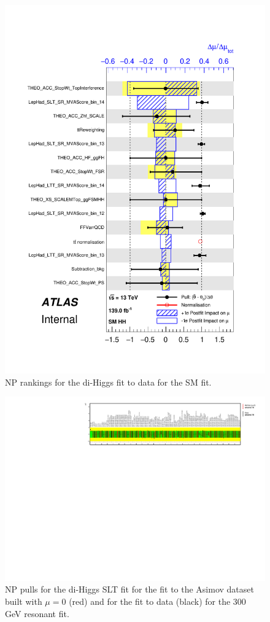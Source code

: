    \begin{figure}
   \centering
   \includegraphics[width=.8\textwidth]{figures/results/HH/LepHad/pulls_SigXsecOverSM_125.pdf}
   \caption{NP rankings for the di-Higgs \lephad fit to data for the SM fit.}
   \label{fig:LepHadPostfitNPRankingsSM-Aux}
   \end{figure}

\begin{figure}
\centering
\includegraphics[angle=270]{figures/results/HH/LepHad/NP_allExceptGammas_2HDM300_SLT.pdf}
\caption{NP pulls for the di-Higgs \lephad SLT fit for the fit to the Asimov dataset built with $\mu=0$ (red) and for the fit to data (black) for the 300 GeV resonant fit.}
\label{fig:LepHadPostfitNPPulls2HDM300SLT}
\end{figure}


